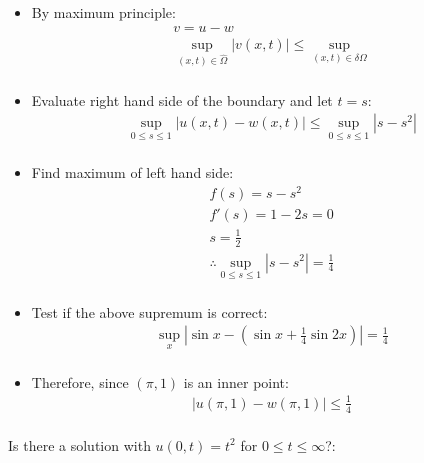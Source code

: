 \documentclass[12pt, a4paper]{article}
\begin{document}
\begin{itemize}
    \item By maximum principle:
    \begin{gather*}
        v = u-w\\
        \sup_{(x, t)\in \hat{\Omega}} |v(x, t)| \leq \sup_{(x, t)\in \delta\Omega}\\
    \end{gather*}
    \item Evaluate right hand side of the boundary and let $t = s$:
    \begin{gather*}
        \sup_{0\leq s\leq 1} |u(x, t)-w(x,t)| \leq \sup_{0\leq s\leq 1} |s-s^2|\\
    \end{gather*}
    \item Find maximum of left hand side:
    \begin{gather*}
        f(s) = s-s^2\\
        f'(s) = 1 - 2s = 0\\
        s = \frac{1}{2}\\
        \therefore \sup_{0\leq s\leq 1} |s-s^2| = \frac{1}{4}\\
    \end{gather*}
    \item Test if the above supremum is correct:
    \begin{gather*}
        \sup_{x} \left|\sin x - (\sin x + \frac{1}{4}\sin 2x)\right| = \frac{1}{4}\\
    \end{gather*}
    \item Therefore, since $(\pi, 1)$ is an inner point:
    \begin{gather*}
        |u(\pi, 1) - w(\pi, 1)| \leq \frac{1}{4}\\
    \end{gather*}
\end{itemize}
Is there a solution with $u(0, t) = t^2$ for $0\leq t \leq \infty$?:
\end{document}
